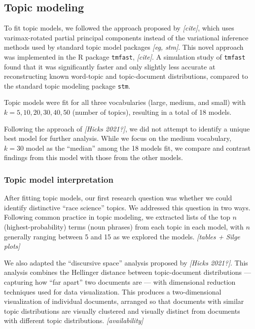 \documentclass[12pt]{article}
\begin{document}
\hypertarget{topic-modeling}{%
\subsection*{Topic modeling}\label{topic-modeling}}

To fit topic models, we followed the approach proposed by
\emph{{[}cite{]}}, which uses varimax-rotated partial principal
components instead of the variational inference methods used by standard
topic model packages \emph{{[}eg, stm{]}}. This novel approach was
implemented in the R package \texttt{tmfast}, \emph{{[}cite{]}}. A
simulation study of \texttt{tmfast} found that it was significantly
faster and only slightly less accurate at reconstructing known
word-topic and topic-document distributions, compared to the standard
topic modeling package \texttt{stm}.

Topic models were fit for all three vocabularies (large, medium, and
small) with \(k = 5, 10, 20, 30, 40, 50\) (number of topics), resulting
in a total of 18 models.

Following the approach of \emph{{[}Hicks 2021?{]}}, we did not attempt
to identify a unique best model for further analysis. While we focus on
the medium vocabulary, \(k=30\) model as the ``median'' among the 18
models fit, we compare and contrast findings from this model with those
from the other models.

\hypertarget{topic-model-interpretation}{%
\subsubsection*{Topic model
interpretation}\label{topic-model-interpretation}}

After fitting topic models, our first research question was whether we
could identify distinctive ``race science'' topics. We addressed this
question in two ways. Following common practice in topic modeling, we
extracted lists of the top \(n\) (highest-probability) terms (noun
phrases) from each topic in each model, with \(n\) generally ranging
between 5 and 15 as we explored the models. \emph{{[}tables + Silge
plots{]}}

We also adapted the ``discursive space'' analysis proposed by
\emph{{[}Hicks 2021?{]}}. This analysis combines the Hellinger distance
between topic-document distributions --- capturing how ``far apart'' two
documents are --- with dimensional reduction techniques used for data
visualization. This produces a two-dimensional visualization of
individual documents, arranged so that documents with similar topic
distributions are visually clustered and visually distinct from
documents with different topic distributions. \emph{{[}availability{]}}
\end{document}

